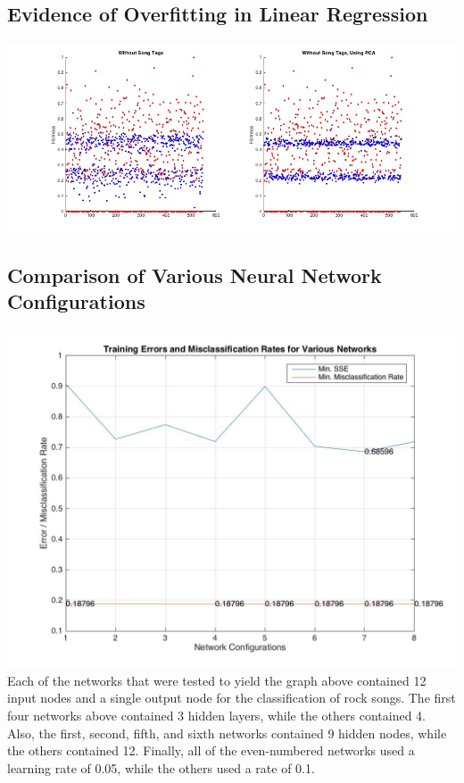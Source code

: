 \documentclass[12pt]{article}
\begin{document}
\subsection{Evidence of Overfitting in Linear Regression}
\label{subsec:overfitting}
\includegraphics[scale=.4]{images/lr/overfit}
\subsection{Comparison of Various Neural Network Configurations}
\label{subsec:variousANN}
\includegraphics[scale=0.3]{images/ann/graphOfVariousNetworksWith1Genre}
\\
Each of the networks that were tested to yield the graph above contained 12 input nodes and a single output node for the classification of rock songs. The first four networks above contained 3 hidden layers, while the others contained 4. Also, the first, second, fifth, and sixth networks contained 9 hidden nodes, while the others contained 12. Finally, all of the even-numbered networks used a learning rate of 0.05, while the others used a rate of 0.1.
\end{document}
